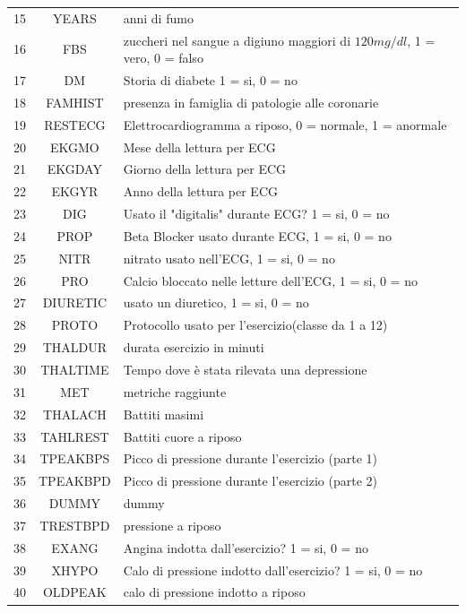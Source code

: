 \documentclass[a4paper]{article}
\begin{document}
\begin{center}
{\begin{tabular}{| p{20mm} | c | p{100mm} |}
            15 & YEARS & anni di fumo \\
            16 &  FBS & zuccheri nel sangue a digiuno maggiori di $120mg/dl$, 1 = vero, 0 = falso \\
            17 & DM & Storia di diabete 1 = si, 0 = no \\
            18 & FAMHIST & presenza in famiglia di patologie alle coronarie \\
            19 & RESTECG & Elettrocardiogramma a riposo, 0 = normale, 1 = anormale \\
            20 & EKGMO & Mese della lettura per ECG \\
            21 & EKGDAY & Giorno della lettura per ECG \\
            22 & EKGYR & Anno della lettura per ECG \\
            23 & DIG & Usato il "digitalis" durante ECG? 1 = si, 0 = no \\
            24 & PROP & Beta Blocker usato durante ECG, 1 = si, 0 = no \\
            25 & NITR & nitrato usato nell'ECG, 1 = si, 0 = no \\
            26 & PRO & Calcio bloccato nelle letture dell'ECG, 1 = si, 0 = no \\
            27 & DIURETIC & usato un diuretico, 1 = si, 0 = no \\
            28 & PROTO & Protocollo usato per l'esercizio(classe da 1 a 12) \\
            29 & THALDUR & durata esercizio in minuti \\
            30 & THALTIME & Tempo dove è stata rilevata una depressione \\
            31 & MET & metriche raggiunte \\
            32 & THALACH & Battiti masimi \\
            33 & TAHLREST & Battiti cuore a riposo \\
            34 & TPEAKBPS & Picco di pressione durante l'esercizio (parte 1) \\
            35 & TPEAKBPD & Picco di pressione durante l'esercizio (parte 2) \\
            36 & DUMMY & dummy \\
            37 & TRESTBPD & pressione a riposo \\
            38 & EXANG & Angina indotta dall'esercizio? 1 = si, 0 = no \\
            39 & XHYPO & Calo di pressione indotto dall'esercizio? 1 = si, 0 = no \\
            40 & OLDPEAK & calo di pressione indotto a riposo \\
        \end{tabular}
    }
    

\end{center}
\end{document}
